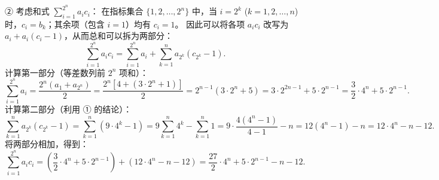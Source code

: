 \begin{answer}
② 考虑和式 $\sum_{i=1}^{2^n} a_i c_i$：
在指标集合 $\{1, 2, \dots, 2^n\}$ 中，当 $i = 2^k$ ($k = 1, 2, \dots, n$) 时，$c_i = b_k$；其余项（包含 $i=1$）均有 $c_i = 1$。
因此可以将各项 $a_i c_i$ 改写为 $a_i + a_i(c_i - 1)$，从而总和可以拆为两部分：
\nopagebreak[4]
\[\sum_{i=1}^{2^n} a_i c_i = \sum_{i=1}^{2^n} a_i + \sum_{k=1}^n a_{2^k}(c_{2^k} - 1).\]
计算第一部分（等差数列前 $2^n$ 项和）：
\nopagebreak[4]
\[\sum_{i=1}^{2^n} a_i = \frac{2^n (a_1 + a_{2^n})}{2} = \frac{2^n [4 + (3 \cdot 2^n + 1)]}{2} = 2^{n-1}(3 \cdot 2^n + 5) = 3 \cdot 2^{2n-1} + 5 \cdot 2^{n-1} = \frac{3}{2} \cdot 4^n + 5 \cdot 2^{n-1}.\]
计算第二部分（利用 ① 的结论）：
\nopagebreak[4]
\[\sum_{k=1}^n a_{2^k}(c_{2^k} - 1) = \sum_{k=1}^n (9 \cdot 4^k - 1) = 9 \sum_{k=1}^n 4^k - \sum_{k=1}^n 1 = 9 \cdot \frac{4(4^n - 1)}{4 - 1} - n = 12(4^n - 1) - n = 12 \cdot 4^n - n - 12.\]
将两部分相加，得到：
\nopagebreak[4]
\[\sum_{i=1}^{2^n} a_i c_i = \left(\frac{3}{2} \cdot 4^n + 5 \cdot 2^{n-1}\right) + (12 \cdot 4^n - n - 12) = \frac{27}{2} \cdot 4^n + 5 \cdot 2^{n-1} - n - 12.\]



\end{answer}
